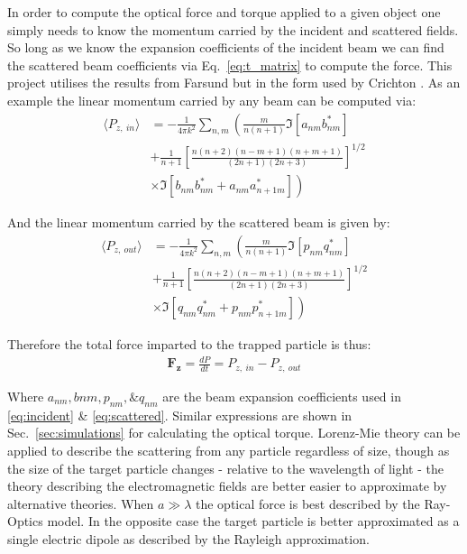 In order to compute the optical force and torque applied to a 
given object one simply needs to know the momentum carried by 
the incident and scattered fields. So long as we know the 
expansion coefficients of the incident beam we can find the 
scattered beam coefficients via Eq.~\eqref{eq:t_matrix} to 
compute the force. This project utilises the results from 
Farsund \cite{Farsund1996} but in the form used by Crichton \cite{Crichton2000THEMD}. As an example the linear momentum 
carried by any beam can be computed via:
\begin{equation}
	\label{eq:linear_momentum_in}
	\begin{split}
		\langle P_{z,\ in} \rangle
		&=
		-\frac{1}{4\pi k^2}\sum_{n,m} \left(\frac{m}{n(n+1)}\Im[a_{nm}b^*_{nm}] \right.
		\\ 
		&+\frac{1}{n+1}\left[\frac{n(n+2)(n-m+1)(n+m+1)}{(2n+1)(2n+3)} \right]^{1/2}
		\\
		& \left.\times\Im[b_{nm}b^*_{nm}+a_{nm}a^*_{n+1m}] \right)
	\end{split}
\end{equation}

And the linear momentum carried by the scattered beam is given by:
\begin{equation}
	\label{eq:linear_momentum_out}
	\begin{split}
		\langle P_{z,\ out} \rangle
		&=
		-\frac{1}{4\pi k^2}\sum_{n,m} \left(\frac{m}{n(n+1)}\Im[p_{nm}q^*_{nm}] \right.
		\\ 
		&+\frac{1}{n+1}\left[\frac{n(n+2)(n-m+1)(n+m+1)}{(2n+1)(2n+3)} \right]^{1/2}
		\\
		& \left.\times\Im[q_{nm}q^*_{nm}+p_{nm}p^*_{n+1m}] \right)
	\end{split}
\end{equation}

Therefore the total force imparted to the trapped particle is thus:
\begin{align}
	\boldsymbol{F_z} =\frac{dP}{dt} = P_{z,\ in} -P_{z,\ out}
	\label{eq:Fz}
\end{align}

\noindent
Where $a_{nm}, b{nm}, p_{nm}, \& q_{nm}$ are the beam expansion 
coefficients used in \eqref{eq:incident} \& \eqref{eq:scattered}.
Similar expressions are shown in Sec.~\ref{sec:simulations} for 
calculating the optical torque. Lorenz-Mie theory can be applied 
to describe the scattering from any particle regardless of size, 
though as the size of the target particle changes - relative to 
the wavelength of light - the theory describing the electromagnetic 
fields are better easier to approximate by alternative theories. 
When $a \gg \lambda$ the optical force is best described by the 
Ray-Optics model. In the opposite case the target particle is 
better approximated as a single electric dipole as described by 
the Rayleigh approximation.  

